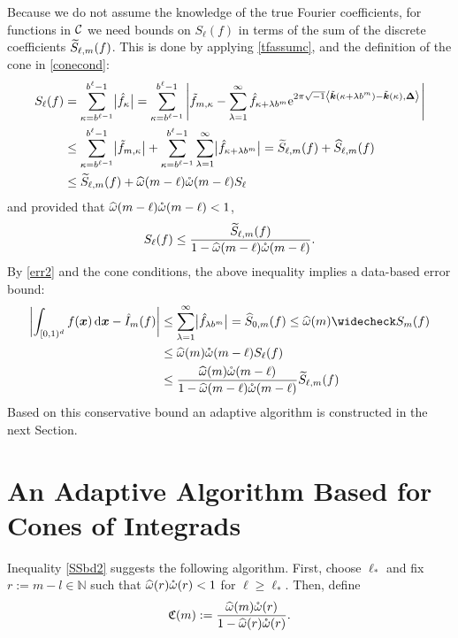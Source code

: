 \documentclass[graybox]{svmult}
\newcommand{\N}{\mathbb{N}} %
\newcommand{\bsx}{\boldsymbol{x}}    %
\newcommand{\bsDelta}{\boldsymbol{\Delta}}    %
\begin{document}
Because we do not assume the knowledge of the true  Fourier  coefficients, for functions in $\mathcal{C}$ we need bounds on $S_{\ell}(f)$ in terms of the sum of the discrete coefficients $\widetilde{S}_{\ell,m}(f)$.  This is done by applying \eqref{tfassumc},  and the definition of the cone in \eqref{conecond}:
\begin{align}
\nonumber
S_\ell(f) &= \sum_{\kappa=b^{\ell-1}}^{b^{\ell}-1} \bigl \lvert \hf_{\kappa}\bigr\rvert= \sum_{\kappa=b^{\ell-1}}^{b^{\ell}-1} \abs{\tf_{m,\kappa} - \sum_{\lambda=1}^{\infty} \hf_{\kappa+\lambda b^{m}} \E^{2 \pi \sqrt{-1} \ip{\tvk(\kappa+\lambda b^{m}) - \tvk(\kappa)}{\bsDelta}}}\\
\nonumber
&\le \sum_{\kappa=b^{\ell-1}}^{b^{\ell}-1} \bigl \lvert \tf_{m,\kappa} \bigr\rvert + \sum_{\kappa=b^{\ell-1}}^{b^{\ell}-1} \sum_{\lambda=1}^{\infty} \bigl \lvert \hf_{\kappa+\lambda b^{m}}\bigr\rvert = \tS_{\ell,m}(f) + \hS_{\ell,m}(f) \\
\label{boundSumbsApproxa}
&\le \tS_{\ell,m}(f) + \homega(m-\ell) \wcomega(m-\ell) S_\ell\
\end{align}
and provided that $\widehat{\omega}(m-\ell) \mathring{\omega}(m-\ell)<1$,
\begin{equation}\label{boundSumsApproxb}
S_\ell(f) \le \frac{\tS_{\ell,m}(f)}{1 - \homega(m-\ell) \wcomega(m-\ell)}.
\end{equation}
By \eqref{err2} and the cone conditions, the above inequality implies a data-based error bound:
\begin{align}
\nonumber
\biggabs{\int_{\cube} f(\bsx) \, \D \bsx - \hI_m(f) }
&\le \sum_{\lambda=1}^{\infty} \bigabs{\hf_{\lambda b^{m}}} 
= \hS_{0,m}(f)\le \homega(m) \wcS_m(f)\\
\nonumber
&  \le \homega(m) \wcomega(m-\ell) S_\ell(f)\\
& \le  \frac{\homega(m) \wcomega(m-\ell)}{1 - \homega(m-\ell) \wcomega(m-\ell)}\tS_{\ell,m}(f)
\label{SSbd2}
\end{align}
Based on this conservative bound an adaptive algorithm is constructed in the next Section. 

\section{An Adaptive Algorithm Based for Cones of Integrads}\label{algorithmsection}

Inequality \eqref{SSbd2} suggests the following algorithm. First, choose $\ell_*$ and fix $r:=m-l \in \N$ such that $\widehat{\omega}(r)\mathring{\omega}(r)<1$ for $\ell\geq\ell_*$. Then, define
\[
\mathfrak{C}(m):= \frac{\widehat{\omega}(m) \mathring{\omega}(r)}{1 - \widehat{\omega}(r) \mathring{\omega}(r)}.
\]
\end{document}
